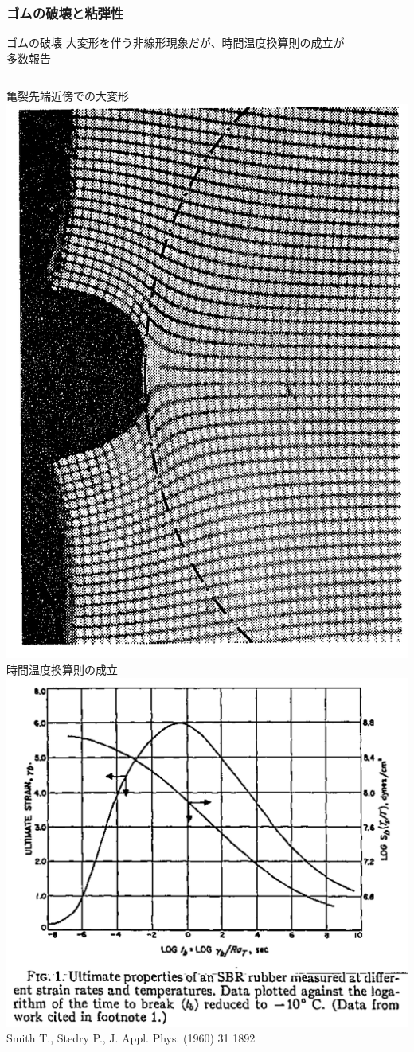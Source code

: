 \documentclass[12pt, dvipdfmx]{beamer}
\begin{document}
\begin{frame}
	\frametitle{ゴムの破壊と粘弾性}
		\begin{alertblock}{ゴムの破壊}
			大変形を伴う非線形現象だが、時間温度換算則の成立が\\多数報告
		\end{alertblock}

		\begin{columns}[totalwidth=1\textwidth]
				亀裂先端近傍での大変形
				\includegraphics[width=.7\textwidth]{rubber_crack.png}
				時間温度換算則の成立
				\includegraphics[width=\textwidth]{Time_Temp_2.png}
				{\tiny Smith T., Stedry P., J. Appl. Phys. (1960) 31 1892}
		\end{columns}
\end{frame}
\end{document}
